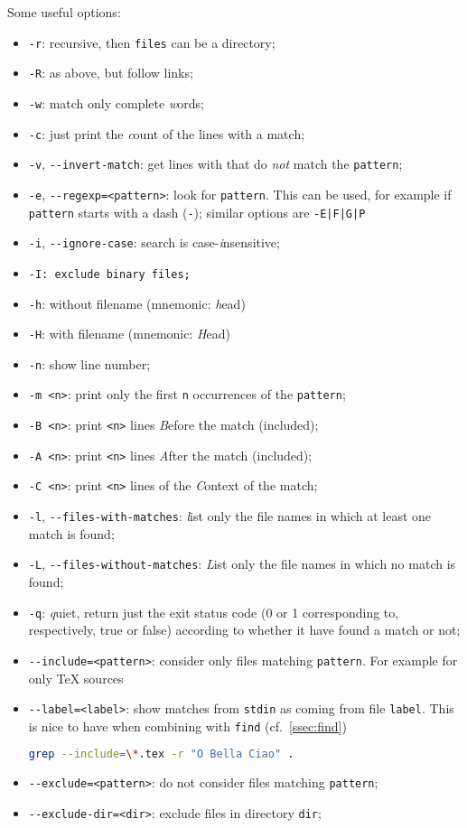\documentclass[a4paper,12pt,%
              final%
              ]{article}
\begin{document}
Some useful options:
\begin{itemize}
  \item \texttt{-r}: recursive, then \texttt{files} can be a directory;
  \item \texttt{-R}: as above, but follow links;
  \item \texttt{-w}: match only complete \emph{w}ords;
  \item \texttt{-c}: just print the \emph{c}ount of the lines with a match;
  \item \texttt{-v}, \verb|--invert-match|: get lines with that do \emph{not} match the \texttt{pattern};
  \item \texttt{-e}, \verb|--regexp=<pattern>|: look for \texttt{pattern}. This can be used, for example if \texttt{pattern} starts with a dash (\texttt{-}); similar options are \verb!-E|F|G|P!
  \item \texttt{-i}, \verb|--ignore-case|: search is case-\emph{i}nsensitive;
  \item \texttt{-I: exclude binary files;}
  \item \texttt{-h}: without filename (mnemonic: \emph{h}ead)
  \item \texttt{-H}: with filename (mnemonic: \emph{H}ead)
  \item \texttt{-n}: show line number;
  \item \texttt{-m <n>}: print only the first \texttt{n} occurrences of the \texttt{pattern};
  \item \texttt{-B <n>}: print \texttt{<n>} lines \emph{B}efore the match (included);
  \item \texttt{-A <n>}: print \texttt{<n>} lines \emph{A}fter the match (included);
  \item \texttt{-C <n>}: print \texttt{<n>} lines of the \emph{C}ontext of the match;
  \item \texttt{-l}, \verb|--files-with-matches|: \emph{l}ist only the file names in which at least one match is found;
  \item \texttt{-L}, \verb|--files-without-matches|: \emph{L}ist only the file names in which no match is found;
  \item \texttt{-q}: \emph{q}uiet, return just the exit status code (0 or 1 corresponding to, respectively, true or false) according to whether it have found a match or not;
  \item \verb|--include=<pattern>|: consider only files matching \texttt{pattern}. For example for only \TeX{} sources
  \item \verb|--label=<label>|: show matches from \texttt{stdin} as coming from file \texttt{label}. This is nice to have when combining with \texttt{find} (cf.\ \autoref{ssec:find})
\begin{lstlisting}[language=bash]
grep --include=\*.tex -r "O Bella Ciao" .
\end{lstlisting}
  \item \verb|--exclude=<pattern>|: do not consider files matching \texttt{pattern};
  \item \verb|--exclude-dir=<dir>|: exclude files in directory \texttt{dir};
\end{itemize}
\end{document}
